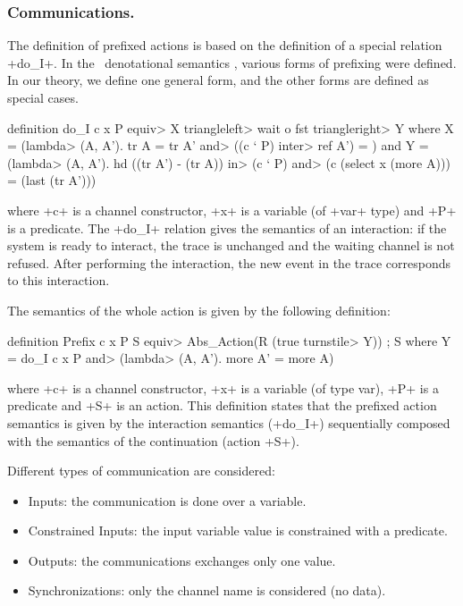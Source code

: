 \documentclass[11pt,a4paper]{article}
\begin{document}
\subsubsection{Communications.}
The definition of prefixed actions is based on the definition of a
special relation \inlineisar+do_I+. 
In the \Circus\ denotational semantics \cite{CircusDS},
various forms of prefixing were defined. In our theory, we define one
general form, and the other forms are defined as special cases.
\begin{isar}
definition do_I c x P \<equiv>     X  \<triangleleft> wait o fst \<triangleright>   Y
where
X = (\<lambda> (A, A'). tr A = tr A' \<and>     ((c ` P) \<inter>  ref A') = {})
and
Y = (\<lambda> (A, A'). hd ((tr A') - (tr A)) \<in>      (c ` P) \<and> 
     (c (select x (more A))) = (last (tr A')))
\end{isar}
where \inlineisar+c+ is a channel constructor, \inlineisar+x+ is a variable (of \inlineisar+var+ type) 
and \inlineisar+P+ is a predicate. The \inlineisar+do_I+ relation gives the semantics of an interaction: 
if the system is ready to interact, the trace is unchanged and the waiting channel is not refused. 
After performing the interaction, the new event in the trace corresponds to this interaction. 

The semantics of the whole action is given by the following definition:
\begin{isar}
definition Prefix c x P S \<equiv>    Abs_Action(R (true \<turnstile>   Y)) ; S
where
Y =  do_I c x P \<and>   (\<lambda> (A, A'). more A' = more A)
\end{isar}
where \inlineisar+c+ is a channel constructor, \inlineisar+x+ is a variable (of type var), 
\inlineisar+P+ is a predicate and \inlineisar+S+ is an action. This definition states that the 
prefixed action semantics is given by the interaction semantics (\inlineisar+do_I+) sequentially 
composed with the semantics of the continuation (action \inlineisar+S+).


Different types of communication are considered: 
\begin{itemize}
\item Inputs: the communication is done over a variable.
\item Constrained Inputs: the input variable value is constrained with a predicate.
\item Outputs: the communications exchanges only one value.
\item Synchronizations: only the channel name is considered (no data).
\end{itemize}
\end{document}
